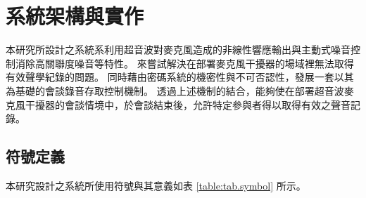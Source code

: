 \chapter{系統架構與實作}

    本研究所設計之系統系利用超音波對麥克風造成的非線性響應輸出與主動式噪音控制消除高關聯度噪音等特性。
來嘗試解決在部署麥克風干擾器的場域裡無法取得有效聲學紀錄的問題。
同時藉由密碼系統的機密性與不可否認性，發展一套以其為基礎的會談錄音存取控制機制。
透過上述機制的結合，能夠使在部署超音波麥克風干擾器的會談情境中，於會談結束後，允許特定參與者得以取得有效之聲音記錄。


\section{符號定義}

    本研究設計之系統所使用符號與其意義如表 \ref{table:tab.symbol} 所示。

